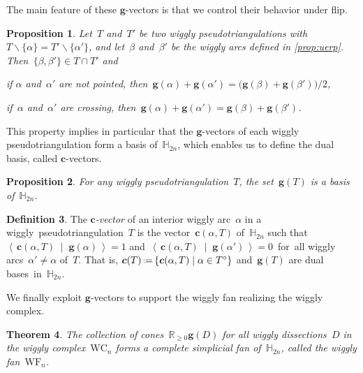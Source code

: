 \documentclass[submission]{FPSAC2025}
\newtheorem{theorem}{Theorem}%
\newtheorem{proposition}[theorem]{Proposition}
\theoremstyle{definition}
\newtheorem{definition}[theorem]{Definition}
\newcommand{\R}{\mathbb{R}} %
\newcommand{\HH}{\mathbb{H}} %
\renewcommand{\b}[1]{{\boldsymbol{#1}}} %
\newcommand{\set}[2]{\left\{ #1 \;\middle|\; #2 \right\}} %
\newcommand{\ssm}{\smallsetminus} %
\newcommand{\dotprod}[2]{\left\langle \, #1 \; \middle| \; #2 \, \right\rangle} %
\newcommand{\eqdef}{\mbox{\,\raisebox{0.2ex}{\scriptsize\ensuremath{\mathrm:}}\ensuremath{=}\,}} %
\newcommand{\darkblue}{\color{darkblue}} %
\newcommand{\defn}[1]{\textsl{\darkblue #1}} %
\newcommand{\wigglyComplex}{\mathrm{WC}} %
\newcommand{\wigglyFan}{\mathrm{WF}} %
\begin{document}
The main feature of these $\b{g}$-vectors is that we control their behavior under flip.

\begin{proposition}
\label{prop:linearDependences}
Let~$T$ and~$T'$ be two wiggly pseudotriangulations with~$T \ssm \{\alpha\} = T' \ssm \{\alpha'\}$, and let~$\beta$ and~$\beta'$ be the wiggly arcs defined in \cref{prop:uerp}.
Then~$\{\beta, \beta'\} \in T \cap T'$ and
\begin{compactitem}
\item if $\alpha$ and~$\alpha'$ are not pointed, then~$\b{g}(\alpha) + \b{g}(\alpha') = \big( \b{g}(\beta) + \b{g}(\beta') \big) / 2$,
\item if~$\alpha$ and~$\alpha'$ are crossing, then~${\b{g}(\alpha) + \b{g}(\alpha') = \b{g}(\beta) + \b{g}(\beta')}$.
\end{compactitem}
\end{proposition}

This property implies in particular that the $\b{g}$-vectors of each wiggly pseudotriangulation form a basis of~$\HH_{2n}$, which enables us to define the dual basis, called $\b{c}$-vectors.

\begin{proposition}
\label{prop:basis}
For any wiggly pseudotriangulation~$T$, the set~$\b{g}(T)$ is a basis of~$\HH_{2n}$.
\end{proposition}

\begin{definition}
\label{def:cvectors}
The \defn{$\b{c}$-vector} of an interior wiggly arc~$\alpha$ in a \mbox{wiggly pseudotriangulation~$T$} is the vector~$\b{c}(\alpha, T)$ of~$\HH_{2n}$ such that~$\dotprod{\b{c}(\alpha, T)\!}{\!\b{g}(\alpha)} \!=\! 1$ and~$\dotprod{\b{c}(\alpha, T)\!}{\!\b{g}(\alpha')} \!=\! 0$~for~all wiggly arcs~$\alpha' \ne \alpha$ of~$T$.
That is, $\b{c}(T) \eqdef \! \set{\b{c}(\alpha, T)}{\alpha \in T^\circ}$ and~$\b{g}(T)$ are dual bases~in~$\HH_{2n}$.
\end{definition}

We finally exploit $\b{g}$-vectors to support the wiggly fan realizing the wiggly complex.

\begin{theorem}
\label{thm:wigglyFan}
The collection of cones~$\R_{\ge 0} \b{g}(D) $ for all wiggly dissections~$D$ in the wiggly complex~$\wigglyComplex_n$ forms a complete simplicial fan of~$\HH_{2n}$, called the \defn{wiggly fan}~$\wigglyFan_n$.
\end{theorem}
\end{document}
